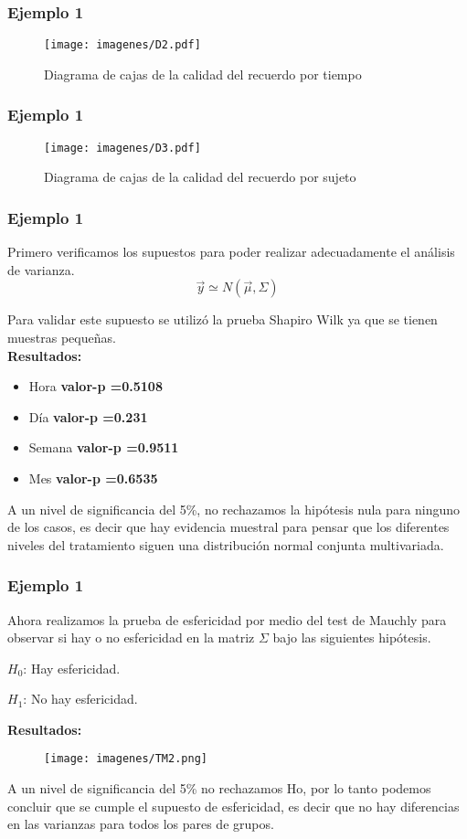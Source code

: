 \documentclass[12pt]{beamer}
\begin{document}
\begin{frame}
\frametitle{Ejemplo 1}
\begin{figure}[h!]
\caption{Diagrama de cajas de la calidad del recuerdo por tiempo}
  \centering
  \texttt{[image: imagenes/D2.pdf]}
\end{figure}
\end{frame}

\begin{frame}
\frametitle{Ejemplo 1}
\begin{figure}[h!]
\caption{Diagrama de cajas de la calidad del recuerdo por sujeto}
  \centering
  \texttt{[image: imagenes/D3.pdf]}
\end{figure}
\end{frame}

\begin{frame}
\frametitle{Ejemplo 1}
Primero verificamos los supuestos para poder realizar adecuadamente el análisis de varianza. 
 $$\vec{y} \simeq N(\vec{\mu},\Sigma)$$

Para validar este supuesto se utilizó la prueba Shapiro Wilk ya que se tienen muestras pequeñas.
~\\\textbf{Resultados:}
\begin{itemize}
\item[]Hora \textbf{valor-p =0.5108}
\item[]Día \textbf{valor-p =0.231}
\item[]Semana \textbf{valor-p =0.9511}
\item[]Mes \textbf{valor-p =0.6535}
\end{itemize}
A un nivel de significancia del 5\%, no rechazamos la hipótesis nula para ninguno de los casos, es
decir que hay evidencia muestral para pensar que los diferentes niveles del tratamiento siguen una distribución normal conjunta multivariada.
\end{frame}

\begin{frame}
\frametitle{Ejemplo 1}
Ahora realizamos la prueba de esfericidad por medio del test de Mauchly para observar si hay o no
esfericidad en la matriz $\Sigma$ bajo las siguientes hipótesis.
\begin{center}
$H_0$: Hay esfericidad.

$H_1$: No hay esfericidad.
\end{center}
\textbf{Resultados:}
\begin{figure}[h!]
  \centering
  \texttt{[image: imagenes/TM2.png]}
\end{figure}
A un nivel de significancia del 5\% no rechazamos Ho, por lo tanto podemos concluir que se cumple
el supuesto de esfericidad, es decir que no hay diferencias en las varianzas para todos los pares
de grupos.
\end{frame}
\end{document}
